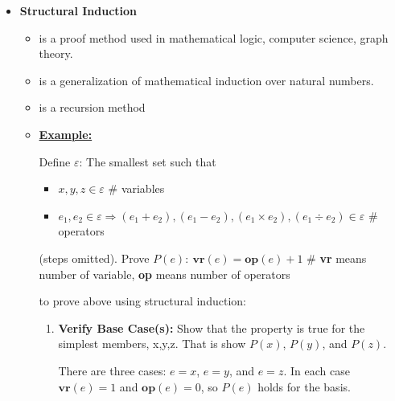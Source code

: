 \documentclass[12pt]{article}
\begin{document}
\begin{itemize}
    \item \textbf{Structural Induction}
    \begin{itemize}
        \item is a proof method used in mathematical logic, computer science, graph theory.
        \item is a generalization of mathematical induction over natural numbers.
        \item is a recursion method
        \item
        \underline{\textbf{Example:}}

        \begin{mdframed}

            Define $\varepsilon$: The smallest set such that
            \begin{itemize}
                \item $x,y,z \in \varepsilon$ \color{red}\# variables\color{black}
                \item $e_1, e_2 \in \varepsilon \Rightarrow (e_1 + e_2), (e_1 - e_2),
                (e_1 \times e_2),(e_1 \div e_2) \in \varepsilon$ \color{red}\# operators\color{black}
            \end{itemize}

            \bigskip

            (steps omitted). Prove $P(e):\:\textbf{vr}(e) = \textbf{op}(e) + 1$ \color{red}\# \textbf{vr} means number of variable,
            \textbf{op} means number of operators\color{black}

        \end{mdframed}

        \bigskip

        to prove above using structural induction:

        \bigskip

        \begin{enumerate}[1.]
            \item \textbf{Verify Base Case(s):} Show that the property is true for the
            simplest members, {x,y,z}. That is show $P(x)$, $P(y)$, and $P(z)$.

            \begin{mdframed}
            There are three cases: $e =x$, $e = y$, and $e = z$. In each case $\textbf{vr}(e) = 1$
            and $\textbf{op}(e) = 0$, so $P(e)$ holds for the basis.
            \end{mdframed}


\end{enumerate}
\end{itemize}
\end{itemize}
\end{document}
